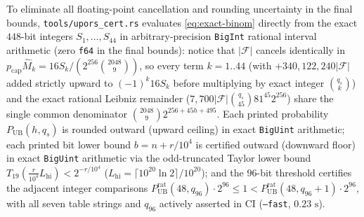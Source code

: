 \documentclass[11pt,a4paper]{article}
\theoremstyle{definition}
\theoremstyle{remark}
\newcommand{\calF}{\mathcal{F}}
\begin{document}
To eliminate all floating-point cancellation and rounding uncertainty in the final bounds, \texttt{tools/upors\_cert.rs} evaluates \eqref{eq:exact-binom} directly from the exact $448$-bit integers $S_1,\dots,S_{44}$ in arbitrary-precision \texttt{BigInt} rational interval arithmetic (zero \texttt{f64} in the final bounds): notice that $|\calF|$ cancels identically in $p_{\mathrm{cap}}\widehat{M}_k = 16 S_k / (2^{256}\binom{2048}{9})$, so every term $k = 1..44$ (with $+340{,}122{,}240|\calF|$ added strictly upward to $(-1)^k 16 S_k$ before multiplying by exact integer $\binom{q_s}{k}$) and the exact rational Leibniz remainder ($7{,}700|\calF|\binom{q_s}{45} 81^{45} 2^{256}$) share the single common denominator $\binom{2048}{9} 2^{256 + 45h + 495}$. Each printed probability $P_{\mathrm{UB}}(h, q_s)$ is rounded outward (upward ceiling) in exact \texttt{BigUint} arithmetic; each printed bit lower bound $b = n + r/10^4$ is certified outward (downward floor) in exact \texttt{BigUint} arithmetic via the odd-truncated Taylor lower bound $T_{19}(\frac{r}{10^4} L_{\mathrm{hi}}) < 2^{-r/10^4}$ ($L_{\mathrm{hi}} = \lceil 10^{20}\ln 2\rceil / 10^{20}$); and the $96$-bit threshold certifies the adjacent integer comparisons $P_{\mathrm{UB}}^{\mathrm{rat}}(48, q_{96}) \cdot 2^{96} \le 1 < P_{\mathrm{UB}}^{\mathrm{rat}}(48, q_{96} + 1) \cdot 2^{96}$, with all seven table strings and $q_{96}$ actively asserted in CI (\texttt{--fast}, $0.23\text{ s}$).
\end{document}

